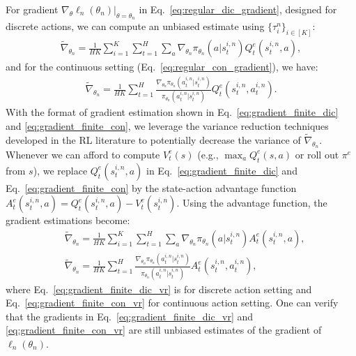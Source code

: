 \documentclass{article}
\begin{document}
For gradient $\nabla_{\theta}\ell_n(\theta_n)|_{\theta=\theta_n}$ in Eq.~\ref{eq:regular_dic_gradient},   designed for discrete actions, we can compute an unbiased estimate using $\{\tau_i^n\}_{i\in[K]}$:
\begin{align}
\label{eq:gradient_finite_dic}
\tilde{\nabla}_{\theta_n} = \frac{1}{HK}\sum_{i=1}^K\sum_{t=1}^H\sum_{a}\nabla_{\theta_n}\pi_{\theta_n}(a|s^{i,n}_t) Q_t^e(s^{i,n}_t, a),
\end{align} and for the continuous setting (Eq.~\ref{eq:regular_con_gradient}), we have:
\begin{align}
\label{eq:gradient_finite_con}
\tilde{\nabla}_{\theta_n} = \frac{1}{HK}\sum_{t=1}^H \frac{\nabla_{\theta_n}\pi_{\theta_n}(a^{i,n}_t|s_t^{i,n})}{\pi_{\theta_n}(a_t^{i,n}|s_t^{i,n})}Q_t^e(s_t^{i,n},a_t^{i,n}).
\end{align}
With the format of gradient estimation shown in Eq.~\ref{eq:gradient_finite_dic} and \ref{eq:gradient_finite_con}, we leverage the variance reduction techniques developed in the RL literature \cite{greensmith2004variance} to potentially decrease the variance of $\tilde{\nabla}_{\theta_n}$. Whenever we can afford to compute $V_t^e(s)$ (e.g., $\max_a Q_t^e(s,a)$ or roll out $\pi^e$ from $s$), we replace $Q_t^e(s_t^{i,n},a)$ in Eq.~\ref{eq:gradient_finite_dic} and Eq.~\ref{eq:gradient_finite_con} by the state-action advantage function $A^e_t(s_t^{i,n},a) = Q^e_t(s_t^{i,n},a) - V_t^e(s_t^{i,n})$. Using the advantage function, the gradient estimations become:
\begin{align}
&\tilde{\nabla}_{\theta_n} = \frac{1}{HK}\sum_{i=1}^K\sum_{t=1}^H\sum_{a}\nabla_{\theta_n}\pi_{\theta_n}(a|s^{i,n}_t) A_t^e(s^{i,n}_t, a), \label{eq:gradient_finite_dic_vr}\\
&\tilde{\nabla}_{\theta_n} = \frac{1}{HK}\sum_{t=1}^H \frac{\nabla_{\theta_n}\pi_{\theta_n}(a^{i,n}_t|s_t^{i,n})}{\pi_{\theta_n}(a_t^{i,n}|s_t^{i,n})}A_t^e(s_t^{i,n},a_t^{i,n}), 
\label{eq:gradient_finite_con_vr}
\end{align} where Eq.~\ref{eq:gradient_finite_dic_vr} is for discrete action setting and Eq.~\ref{eq:gradient_finite_con_vr} for continuous action setting. One can verify that the gradients in Eq.~\ref{eq:gradient_finite_dic_vr} and \ref{eq:gradient_finite_con_vr} are still unbiased estimates of the gradient of $\ell_n(\theta_n)$.
\end{document}
